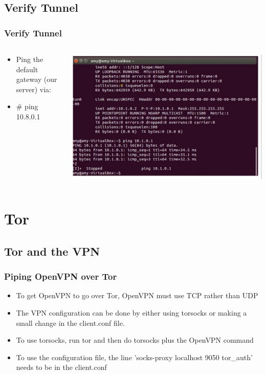 \documentclass{beamer}
\begin{document}
\subsection{Verify Tunnel}
\begin{frame}
\frametitle{Verify Tunnel}
\begin{columns}
    \begin{column}{0.48\textwidth}
        \begin{itemize}
        		\item Ping the default gateway (our server) via:
        		\item \# ping 10.8.0.1
        \end{itemize}
    \end{column}
    \begin{column}{.5\textwidth}
        \includegraphics[width=.9\linewidth]{right}
    \end{column}
\end{columns}
\end{frame}


\section{Tor}
\subsection{Tor and the VPN}
\begin{frame}
\frametitle{Piping OpenVPN over Tor}
\begin{itemize}
\item To get OpenVPN to go over Tor, OpenVPN must use TCP rather than UDP
\item The VPN configuration can be done by either using torsocks or making a small change in the client.conf file.
\item To use torsocks, run tor and then do torsocks plus the OpenVPN command
\item To use the configuration file, the line 'socks-proxy localhost 9050 tor\_auth' needs to be in the client.conf
\end{itemize}
\end{frame}
\end{document}
